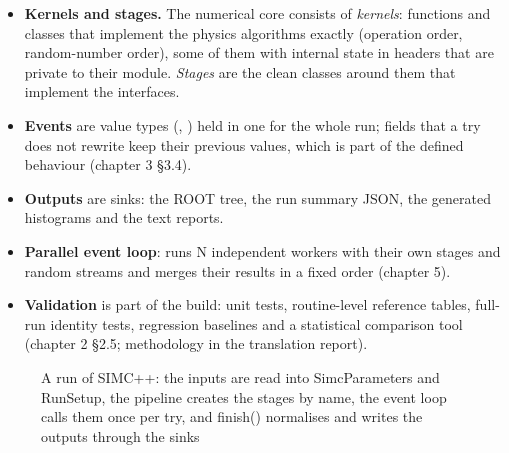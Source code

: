 \begin{itemize}
radiator, physics model).
\item \textbf{Kernels and stages.} The numerical core consists of \emph{kernels}: functions and classes that implement the physics
algorithms exactly (operation order, random-number order), some of them with internal state in  headers that
are private to their module. \emph{Stages} are the clean classes around them that implement the interfaces.
\item \textbf{Events} are value types (, ) held in one  for the whole run; fields that a try does not
rewrite keep their previous values, which is part of the defined behaviour (chapter 3 §3.4).
\item \textbf{Outputs} are sinks: the ROOT tree, the run summary JSON, the generated histograms and the text reports.
\item \textbf{Parallel event loop}:  runs N independent workers with their own stages and random streams and merges
their results in a fixed order (chapter 5).
\item \textbf{Validation} is part of the build: unit tests, routine-level reference tables, full-run identity tests, regression
baselines and a statistical comparison tool (chapter 2 §2.5; methodology in the translation report).
\end{itemize}
\begin{figure}[htbp]
\caption[A run of SIMC++]{A run of SIMC++: the inputs are read into SimcParameters and RunSetup, the pipeline creates the stages by name, the event loop calls them once per try, and finish() normalises and writes the outputs through the sinks}\label{fig:runu5fflow}
\end{figure}
